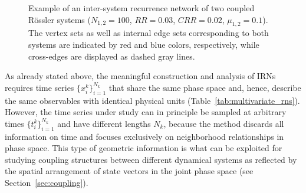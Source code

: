 \documentclass[graybox]{svmult}
\begin{document}
\begin{figure}
\centering
{}
\caption{Example of an inter-system recurrence network of two coupled R\"ossler systems ($N_{1,2}=100$, $RR=0.03$, $CRR=0.02$, $\mu_{1,2}=0.1$). The vertex sets as well as internal edge sets corresponding to both systems are indicated by red and blue colors, respectively, while cross-edges are displayed as dashed gray lines.}
\label{fig:irn_example}
\end{figure}

As already stated above, the meaningful construction and analysis of IRNs requires time series $\{x_i^k\}_{i=1}^{N_k}$ that share the same phase space and, hence, describe the same observables with identical physical units (Table~\ref{tab:multivariate_rns}). However, the time series under study can in principle be sampled at arbitrary times $\{t^k_i\}_{i=1}^{N_k}$ and have different lengths $N_k$, because the method discards all information on time and focuses exclusively on neighborhood relationships in phase space. This type of geometric information is what can be exploited for studying coupling structures between different dynamical systems as reflected by the spatial arrangement of state vectors in the joint phase space (see Section~\ref{sec:coupling}).
\end{document}
